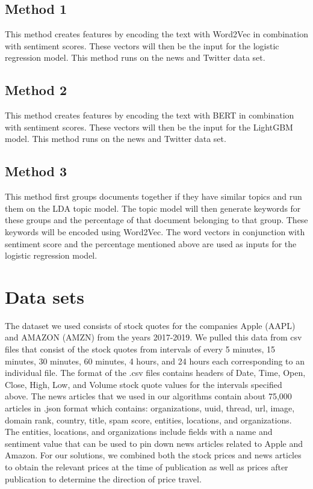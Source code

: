 \documentclass[conference]{IEEEtran}
\begin{document}
\subsection{Method 1}
This method creates features by encoding the text with Word2Vec in combination with sentiment scores. These vectors will then be the input for the logistic regression model. This method runs on the news and Twitter data set.
\subsection{Method 2}
This method creates features by encoding the text with BERT in combination with sentiment scores. These vectors will then be the input for the LightGBM model. This method runs on the news and Twitter data set.
\subsection{Method 3}
This method first groups documents together if they have similar topics and run them on the LDA topic model. The topic model will then generate keywords for these groups and the percentage of that document belonging to that group. These keywords will be encoded using Word2Vec. The word vectors in conjunction with sentiment score and the percentage mentioned above are used as inputs for the logistic regression model.

\section{Data sets}
The dataset we used consists of stock quotes for the companies Apple (AAPL) and AMAZON (AMZN) from the years 2017-2019. We pulled this data from csv files that consist of the stock quotes from intervals of every 5 minutes, 15 minutes, 30 minutes, 60 minutes, 4 hours, and 24 hours each corresponding to an individual file. The format of the .csv files contains headers of Date, Time, Open, Close, High, Low, and Volume stock quote values for the intervals specified above. The news articles that we used in our algorithms contain about 75,000 articles in .json format which contains: organizations, uuid, thread, url, image, domain rank, country, title, spam score, entities, locations, and organizations. The entities, locations, and organizations include fields with a name and sentiment value that can be used to pin down news articles related to Apple and Amazon.
For our solutions, we combined both the stock prices and news articles to obtain the relevant prices at the time of publication as well as prices after publication to determine the direction of price travel.
\end{document}

